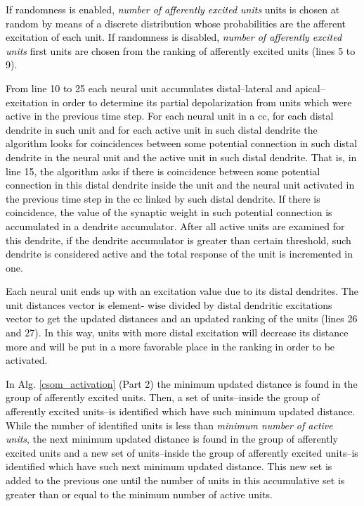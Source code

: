 \documentclass[10pt,letterpaper]{article}
\newcommand{\reviewerfour}[1]{\textcolor{black}{#1}}
\begin{document}
\reviewerfour{If randomness is enabled, \emph{number of afferently excited units} units is chosen at random by means of a discrete distribution whose probabilities are the afferent excitation of each unit. If randomness is disabled, \emph{number of afferently excited units} first units are chosen from the ranking of afferently excited units (lines 5 to 9)}.

\reviewerfour{From line 10 to 25 each neural unit accumulates distal--lateral and apical--excitation in order to determine its partial depolarization from units which were active in the previous time step. For each neural unit in a \gls{cc}, for each distal dendrite in such unit and for each active unit in such distal dendrite the algorithm looks for coincidences between some potential connection in such distal dendrite in the neural unit and the active unit in such distal dendrite. That is, in line 15, the algorithm asks if there is coincidence between some potential connection in this distal dendrite inside the unit and the neural unit activated in the previous time step in the \gls{cc} linked by such distal dendrite. If there is coincidence, the value of the synaptic weight in such potential connection is accumulated in a dendrite accumulator. After all active units are examined for this dendrite, if the dendrite accumulator is greater than certain threshold, such dendrite is considered active and the total response of the unit is incremented in one}.

\reviewerfour{Each neural unit ends up with an excitation value due to its distal dendrites. The unit distances vector is element- wise divided by distal dendritic excitations vector to get the updated distances and an updated ranking of the units (lines 26 and 27). In this way, units with more distal excitation will decrease its distance more and will be put in a more favorable place in the ranking in order to be activated}.

\reviewerfour{In Alg. \ref{csom_activation} (Part 2) the minimum updated distance is found in the group of afferently excited units. Then, a set of units--inside the group of afferently excited units--is identified which have such minimum updated distance. While the number of identified units is less than \emph{minimum number of active units}, the next   minimum updated distance is found in the group of afferently excited units and a new set of units--inside the group of afferently excited units--is identified which have such next minimum updated distance. This new set is added to the previous one until the number of units in this accumulative set is greater than or equal to the minimum number of active units}.
\end{document}

